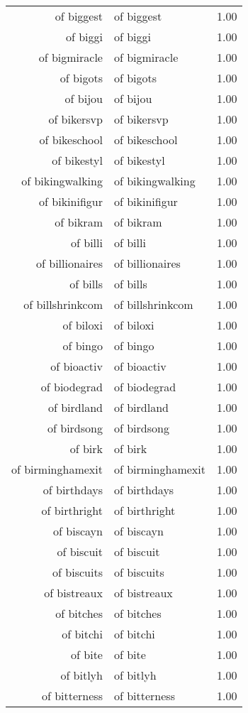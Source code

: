 \begin{table}[ht]
\begin{tabular}{rlr}
  of biggest & of biggest & 1.00 \\ 
  of biggi & of biggi & 1.00 \\ 
  of bigmiracle & of bigmiracle & 1.00 \\ 
  of bigots & of bigots & 1.00 \\ 
  of bijou & of bijou & 1.00 \\ 
  of bikersvp & of bikersvp & 1.00 \\ 
  of bikeschool & of bikeschool & 1.00 \\ 
  of bikestyl & of bikestyl & 1.00 \\ 
  of bikingwalking & of bikingwalking & 1.00 \\ 
  of bikinifigur & of bikinifigur & 1.00 \\ 
  of bikram & of bikram & 1.00 \\ 
  of billi & of billi & 1.00 \\ 
  of billionaires & of billionaires & 1.00 \\ 
  of bills & of bills & 1.00 \\ 
  of billshrinkcom & of billshrinkcom & 1.00 \\ 
  of biloxi & of biloxi & 1.00 \\ 
  of bingo & of bingo & 1.00 \\ 
  of bioactiv & of bioactiv & 1.00 \\ 
  of biodegrad & of biodegrad & 1.00 \\ 
  of birdland & of birdland & 1.00 \\ 
  of birdsong & of birdsong & 1.00 \\ 
  of birk & of birk & 1.00 \\ 
  of birminghamexit & of birminghamexit & 1.00 \\ 
  of birthdays & of birthdays & 1.00 \\ 
  of birthright & of birthright & 1.00 \\ 
  of biscayn & of biscayn & 1.00 \\ 
  of biscuit & of biscuit & 1.00 \\ 
  of biscuits & of biscuits & 1.00 \\ 
  of bistreaux & of bistreaux & 1.00 \\ 
  of bitches & of bitches & 1.00 \\ 
  of bitchi & of bitchi & 1.00 \\ 
  of bite & of bite & 1.00 \\ 
  of bitlyh & of bitlyh & 1.00 \\ 
  of bitterness & of bitterness & 1.00 \\ 

\end{tabular}
\end{table}
